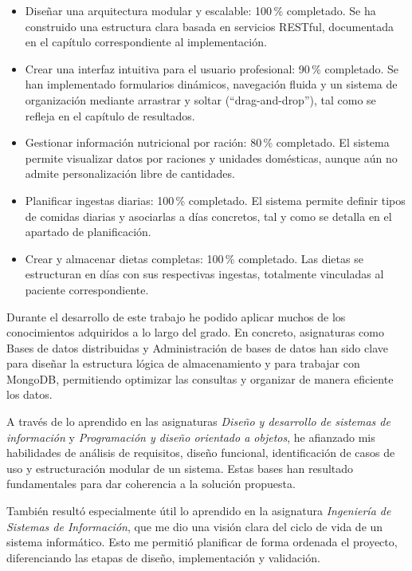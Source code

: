 \begin{itemize}
    \item Diseñar una arquitectura modular y escalable: 100\,\% completado. Se ha construido una estructura clara basada en servicios RESTful, documentada en el capítulo correspondiente al implementación. 
    \item Crear una interfaz intuitiva para el usuario profesional: 90\,\% completado. Se han implementado formularios dinámicos, navegación fluida y un sistema de organización mediante arrastrar y soltar (``drag-and-drop''), tal como se refleja en el capítulo de resultados.
    \item Gestionar información nutricional por ración: 80\,\% completado. El sistema permite visualizar datos por raciones y unidades domésticas, aunque aún no admite personalización libre de cantidades.
    \item Planificar ingestas diarias: 100\,\% completado. El sistema permite definir tipos de comidas diarias y asociarlas a días concretos, tal y como se detalla en el apartado de planificación.
    \item Crear y almacenar dietas completas: 100\,\% completado. Las dietas se estructuran en días con sus respectivas ingestas, totalmente vinculadas al paciente correspondiente.
\end{itemize}

Durante el desarrollo de este trabajo he podido aplicar muchos de los conocimientos adquiridos a lo largo del grado. En concreto, asignaturas como Bases de datos distribuidas y Administración de bases de datos han sido clave para diseñar la estructura lógica de almacenamiento y para trabajar con MongoDB, permitiendo optimizar las consultas y organizar de manera eficiente los datos.

A través de lo aprendido en las asignaturas \textit{Diseño y desarrollo de sistemas de información} y\textit{ Programación y diseño orientado a objetos}, he afianzado mis habilidades de análisis de requisitos, diseño funcional, identificación de casos de uso y estructuración modular de un sistema. Estas bases han resultado fundamentales para dar coherencia a la solución propuesta.

También resultó especialmente útil lo aprendido en la asignatura  \textit{Ingeniería de Sistemas de Información}, que me dio una visión clara del ciclo de vida de un sistema informático. Esto me permitió planificar de forma ordenada el proyecto, diferenciando las etapas de diseño, implementación y validación.


